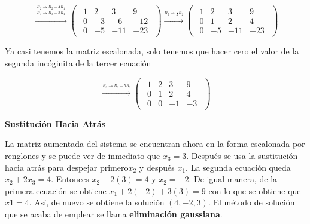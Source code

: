 \documentclass{article}
\begin{document}
\begin{equation*}
    \xrightarrow{\overset{\begin{aligned} R_2 \rightarrow R_2 - 4R_1 \\ R_3 \rightarrow R_3 - 3R_1\end{aligned}}{}} 
    \begin{pmatrix}
        \begin{array}{rrr|r}
            1& 2 & 3 & 9\\
            0 &-3 &-6 &-12 \\
            0&-5 &-11 &-23
        \end{array}
    \end{pmatrix}
    \xrightarrow{\stackrel{R_2 \rightarrow \frac{1}{3}R_2}{}}
    \begin{pmatrix}
        \begin{array}{rrr|r}
            1 & 2 & 3 & 9\\
            0 & 1 & 2 & 4\\
            0 & -5 &-11&-23
        \end{array}
    \end{pmatrix}
\end{equation*}

Ya casi tenemos la matriz escalonada, solo tenemos que hacer cero el valor de la segunda incóginita de la tercer ecuación

\begin{equation*}
    \xrightarrow{\overset{R_3 \rightarrow R_3 + 5R_2}{}} 
    \begin{pmatrix}
        \begin{array}{rrr|r}
            1 & 2 & 3 & 9\\
            0 & 1 & 2 & 4 \\
            0 & 0 &-1 &-3
        \end{array}
    \end{pmatrix}
\end{equation*}

\begin{large}
    \textbf{Sustitución Hacia Atrás}
\end{large}

La matriz aumentada del sistema se encuentran ahora en la forma escalonada por renglones y se puede ver de inmediato que $x_3 = 3$. Después se usa la sustitución hacia atrás para despejar primero$x_2$ y después $x_1$. La segunda ecuación queda $x_2 + 2x_3 = 4$. Entonces $x_2 + 2(3) = 4$ y $x_2 =-2$. De igual manera, de la primera ecuación se obtiene $x_1 + 2(-2) + 3(3) = 9$  con lo que se obtiene que $x1 = 4$. Así, de nuevo se obtiene la solución $(4, -2, 3)$. El método de solución que se acaba de emplear se llama \textbf{eliminación gaussiana}.
\end{document}
